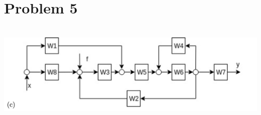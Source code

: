 \documentclass[a4paper,11pt]{article}
\makeatletter
\newcommand{\problemquestion}[1]{\gdef\@problemquestion{#1}}%
\newcommand{\problemsolution}[1]{\gdef\@problemsolution{#1}}%
\theoremstyle{mytheor}
\makeatother
\begin{document}
\section*{Problem 5}
\includegraphics[width=15.3cm, height=5cm]{8.png}


\begin{problem}
  \problemquestion{Find the total transfer function of the system.}
  \problemsolution{
  $$\Phi(s) = \frac{Y}{X} = (W_8 + \frac{W_1}{W_3}) * \frac{W_3W_5W_6W_7}{1-W_6W_4-W_2W_5W_6}$$
  $$\Phi_f(s) = \frac{Y}{F} = \frac{W_3W_5W_6W_7}{1-W_6W_4-W_2W_5W_6}$$
  $$Y = \Phi(s)X + \Phi_f(s)F = \frac{W_3W_5W_6W_7}{1-W_6W_4-W_2W_5W_6} * ((W_8 + \frac{W_1}{W_3})X + F)$$
  
  $$Answer: Y = \frac{W_3W_5W_6W_7}{1-W_6W_4-W_2W_5W_6} * ((W_8 + \frac{W_1}{W_3})X + F)$$
  Reduction of Transfer function diagram is on the next page.
  }
\end{problem}

\end{document}
